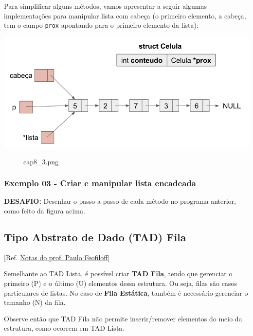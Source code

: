 \documentclass[12pt,a4paper]{article}
\begin{document}
Para simplificar alguns métodos, vamos apresentar a seguir algumas
implementações para manipular lista com cabeça (o primeiro elemento, a
cabeça, tem o campo \texttt{prox} apontando para o primeiro elemento da
lista):

\includegraphics{"figs/cap8_3.png"}

    \begin{figure}
\centering
\caption{cap8\_3.png}
\end{figure}

    \hypertarget{exemplo-03---criar-e-manipular-lista-encadeada}{%
\subsubsection{Exemplo 03 - Criar e manipular lista
encadeada}\label{exemplo-03---criar-e-manipular-lista-encadeada}}

    \textbf{DESAFIO:} Desenhar o passo-a-passo de cada método no programa
anterior, como feito da figura acima.

    \hypertarget{tipo-abstrato-de-dado-tad-fila}{%
\subsection{Tipo Abstrato de Dado (TAD)
Fila}\label{tipo-abstrato-de-dado-tad-fila}}

    {[}Ref.
\href{https://www.ime.usp.br/~pf/algoritmos/aulas/fila.html}{Notas do
prof. Paulo Feofiloff}{]}

Semelhante ao TAD Lista, é possível criar \textbf{TAD Fila}, tendo que
gerenciar o primeiro (P) e o último (U) elementos dessa estrutura. Ou
seja, filas são casos particulares de listas. No caso de \textbf{Fila
Estática}, também é necessário gerenciar o tamanho (N) da fila.

Observe então que TAD Fila não permite inserir/remover elementos do meio
da estrutura, como ocorrem em TAD Lista.
\end{document}
